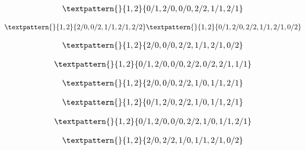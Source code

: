 \begin{equation}
	\begin{gathered}
		\textpattern{}{1,2}{0/1,2/0,0/0,2/2,1/1,2/1}
	\end{gathered}
	\label{cls:190}
\end{equation}

\begin{equation}
	\begin{gathered}
		\textpattern{}{1,2}{2/0,0/2,1/1,2/1,2/2}
		\textpattern{}{1,2}{0/1,2/0,2/2,1/1,2/1,0/2}
	\end{gathered}
	\label{cls:191}
\end{equation}

\begin{equation}
	\begin{gathered}
		\textpattern{}{1,2}{2/0,0/0,2/2,1/1,2/1,0/2}
	\end{gathered}
	\label{cls:192}
\end{equation}

\begin{equation}
	\begin{gathered}
		\textpattern{}{1,2}{0/1,2/0,0/0,2/2,0/2,2/1,1/1}
	\end{gathered}
	\label{cls:193}
\end{equation}

\begin{equation}
	\begin{gathered}
		\textpattern{}{1,2}{2/0,0/0,2/2,1/0,1/1,2/1}
	\end{gathered}
	\label{cls:194}
\end{equation}

\begin{equation}
	\begin{gathered}
		\textpattern{}{1,2}{0/1,2/0,2/2,1/0,1/1,2/1}
	\end{gathered}
	\label{cls:195}
\end{equation}

\begin{equation}
	\begin{gathered}
		\textpattern{}{1,2}{0/1,2/0,0/0,2/2,1/0,1/1,2/1}
	\end{gathered}
	\label{cls:196}
\end{equation}

\begin{equation}
	\begin{gathered}
		\textpattern{}{1,2}{2/0,2/2,1/0,1/1,2/1,0/2}
	\end{gathered}
	\label{cls:197}
\end{equation}


